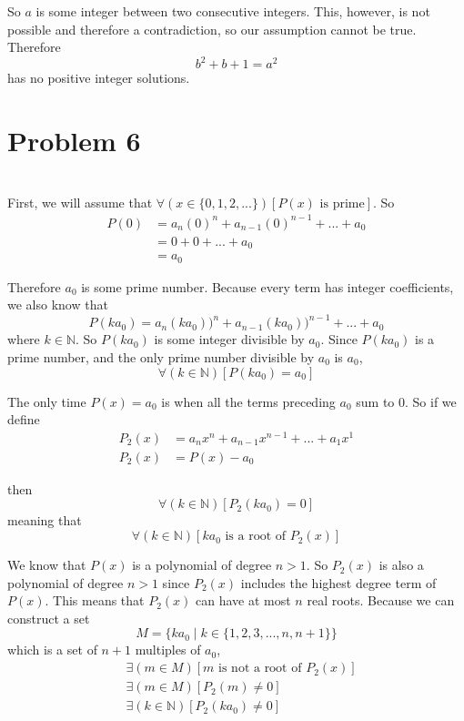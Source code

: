\documentclass[12pt]{article}
\begin{document}
So $a$ is some integer between two consecutive integers. This, however, is not possible and therefore a contradiction, so our assumption cannot be true. Therefore
\[b^2 + b + 1 = a^2\]
has no positive integer solutions.


\newpage
\section*{Problem 6}
\\

First, we will assume that $\forall (x \in \{0, 1, 2,...\})[P(x) \text{ is prime}]$. So
\begin{align*}
    P(0) &= a_n(0)^n + a_{n-1}(0)^{n-1} + ... + a_0 \\
         &= 0 + 0 + ... + a_0 \\
         &= a_0
\end{align*}

Therefore $a_0$ is some prime number. Because every term has integer coefficients, we also know that
\[P(ka_0) = a_n(ka_0))^n + a_{n-1}(ka_0))^{n-1} + ... + a_0\]
where $k \in \mathbb{N}$. So $P(ka_0)$ is some integer divisible by $a_0$. Since $P(ka_0)$ is a prime number, and the only prime number divisible by $a_0$ is $a_0$,
\[\forall(k \in \mathbb{N})[P(ka_0)=a_0]\]

The only time $P(x)=a_0$ is when all the terms preceding $a_0$ sum to 0. So if we define
\begin{align*}
    P_2(x) &= a_nx^n + a_{n-1}x^{n-1} + ... + a_1x^1 \\
    P_2(x) &= P(x) - a_0
\end{align*}

then
\[\forall(k \in \mathbb{N})[P_2(ka_0) = 0]\]
meaning that 
\[\forall(k \in \mathbb{N})[ka_0 \text{ is a root of } P_2(x)]\]

We know that $P(x)$ is a polynomial of degree $n>1$. So $P_2(x)$ is also a polynomial of degree $n>1$ since $P_2(x)$ includes the highest degree term of $P(x)$. This means that $P_2(x)$ can have at most $n$ real roots. Because we can construct a set
\[M = \{ka_0 \mid k \in \{1, 2, 3,..., n, n+1\}\}\]
which is a set of $n+1$ multiples of $a_0$, 
\begin{align*}
    &\exists (m \in M)[m \text{ is not a root of } P_2(x)] \\
    &\exists (m \in M)[P_2(m) \ne 0] \\
    &\exists (k \in \mathbb{N})[P_2(ka_0) \ne 0]
\end{align*}
\end{document}
